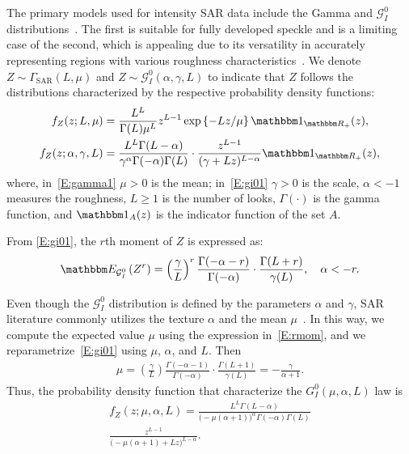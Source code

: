 \documentclass[conference,final,]{IEEEtran}
\begin{document}
The primary models used for intensity SAR data include the Gamma and
\(\mathcal{G}_I^0\) distributions~\cite{Frery1997}. The first is
suitable for fully developed speckle and is a limiting case of the
second, which is appealing due to its versatility in accurately
representing regions with various roughness
characteristics~\cite{Cassetti2022}. We denote
\(Z \sim \Gamma_{\text{SAR}}(L, \mu)\) and
\(Z \sim \mathcal{G}_I^0(\alpha, \gamma, L)\) to indicate that \(Z\)
follows the distributions characterized by the respective probability
density functions: \begin{align}
    f_Z(z;L, \mu)&=\frac{L^L}{\Gamma(L)\mu^L}z^{L-1}\exp\left\{-Lz/\mu\right\} \mathbbm 1_{\mathbbm R_+}(z),\label{E:gamma1}\\
    f_Z(z; \alpha, \gamma, L)&=\frac{L^L\Gamma(L-\alpha)}{\gamma^{\alpha}\Gamma(-\alpha)\Gamma(L)}\cdot\frac{z^{L-1}}{(\gamma+Lz)^{L-\alpha}} \mathbbm 1_{\mathbbm R_+}(z),\label{E:gi01}
\end{align} where, in~\eqref{E:gamma1} \(\mu > 0\) is the mean;
in~\eqref{E:gi01} \(\gamma > 0\) is the scale, \(\alpha < -1\) measures
the roughness, \(L \geq 1\) is the number of looks, \(\Gamma(\cdot)\) is
the gamma function, and \(\mathbbm 1_{A}(z)\) is the indicator function
of the set \(A\).

From \eqref{E:gi01}, the \(r\)th moment of \(Z\) is expressed as:
\begin{align}
    \mathbbm E_{\mathcal{G}_I^0}\left(Z^r\right)=\left(\frac{\gamma}{L}\right)^r\frac{\Gamma(-\alpha-r)}{\Gamma(-\alpha)}\cdot\frac{\Gamma(L+r)}{\gamma(L)}, \quad \alpha <-r. 
    \label{E:rmom}
\end{align}

Even though the \(\mathcal{G}_I^0\) distribution is defined by the
parameters \(\alpha\) and \(\gamma\), SAR literature commonly utilizes
the texture \(\alpha\) and the mean \(\mu\)~\cite{Nascimento2010}. In
this way, we compute the expected value \(\mu\) using the expression
in~\eqref{E:rmom}, and we reparametrize~\eqref{E:gi01} using \(\mu\),
\(\alpha\), and \(L\). Then \begin{align*}
    \mu=\left(\frac{\gamma}{L}\right)\frac{\Gamma(-\alpha-1)}{\Gamma(-\alpha)}\cdot\frac{\Gamma(L+1)}{\gamma(L)}=-\frac{\gamma}{\alpha+1}.
\end{align*} Thus, the probability density function that characterize
the \(G_I^0(\mu, \alpha, L)\) law is \begin{multline}
        f_Z(z; \mu, \alpha, L)=\frac{L^L\Gamma(L-\alpha)}{\big(-\mu(\alpha+1)\big)^{\alpha}\Gamma(-\alpha)\Gamma(L)}\\ \frac{z^{L-1}}{\big(-\mu(\alpha+1)+Lz\big)^{L-\alpha}}.\label{E:gi02}
\end{multline}
\end{document}
